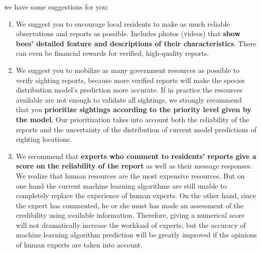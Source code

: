 \documentclass[12pt]{article}
\begin{document}
we have some suggestions for you:
\begin{enumerate}[\bf 1.]
	\item We suggest you to encourage local residents to make as much reliable observations and reports as possible. Includes photos (videos) that \textbf{show bees' detailed feature and descriptions of their characteristics}. There can even be financial rewards for verified, high-quality reports.
	\item We suggest you to mobilize as many government resources as possible to verify sighting reports, because more verified reports will make the species distribution model's prediction more accurate. If in practice the resources available are not enough to validate all sightings, we strongly recommend that you \textbf{prioritize sightings according to the priority level given by the model}. Our prioritization takes into account both the reliability of the reports and the uncertainty of the distribution of current model predictions of sighting locations.
	\item We recommend that \textbf{experts who comment to residents' reports give a score on the reliability of the report} as well as their message responses. We realize that human resources are the most expensive resources. But on one hand the current machine learning algorithms are still unable to completely replace the experience of human experts. On the other hand, since the expert has commented, he or she must has made an assessment of the credibility using available information. Therefore, giving a numerical score will not dramatically increase the workload of experts, but the accuracy of machine learning algorithm prediction will be greatly improved if the opinions of human experts are taken into account.

\end{enumerate}
\end{document}
